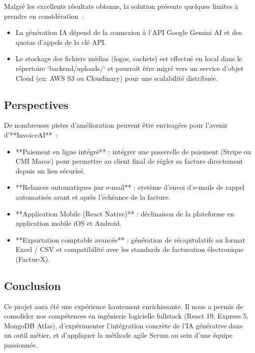 \documentclass[a4paper,12pt]{extarticle}
\begin{document}
Malgré les excellents résultats obtenus, la solution présente quelques limites à prendre en considération~:

\begin{itemize}
  \item La génération IA dépend de la connexion à l'API Google Gemini AI et des quotas d'appels de la clé API.
  \item Le stockage des fichiers médias (logos, cachets) est effectué en local dans le répertoire `backend/uploads/` et pourrait être migré vers un service d'objet Cloud (ex: AWS S3 ou Cloudinary) pour une scalabilité distribuée.
\end{itemize}

\subsection*{Perspectives}

De nombreuses pistes d'amélioration peuvent être envisagées pour l'avenir d'**InvoiceAI**~:

\begin{itemize}
  \item **Paiement en ligne intégré** : intégrer une passerelle de paiement (Stripe ou CMI Maroc) pour permettre au client final de régler sa facture directement depuis un lien sécurisé.
  \item **Relances automatiques par e-mail** : système d'envoi d'e-mails de rappel automatisés avant et après l'échéance de la facture.
  \item **Application Mobile (React Native)** : déclinaison de la plateforme en application mobile iOS et Android.
  \item **Exportation comptable avancée** : génération de récapitulatifs au format Excel / CSV et compatibilité avec les standards de facturation électronique (Factur-X).
\end{itemize}

\subsection*{Conclusion}

Ce projet aura été une expérience hautement enrichissante. Il nous a permis de consolider nos compétences en ingénierie logicielle fullstack (React 19, Express 5, MongoDB Atlas), d'expérimenter l'intégration concrète de l'IA générative dans un outil métier, et d'appliquer la méthode agile Scrum au sein d'une équipe passionnée.
\end{document}
